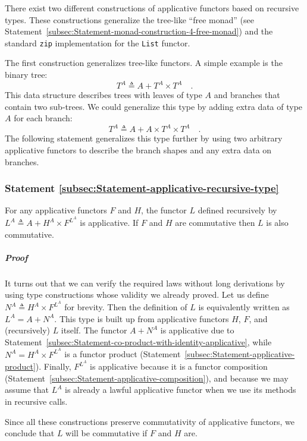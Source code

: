 There exist two different constructions of applicative functors based
on recursive types. These constructions generalize the tree-like \textsf{``}free
monad\textsf{''} (see Statement~\ref{subsec:Statement-monad-construction-4-free-monad})
and the standard \lstinline!zip! implementation for the \lstinline!List!
functor.

The first construction generalizes tree-like functors. A simple example
is the binary tree:
\[
T^{A}\triangleq A+T^{A}\times T^{A}\quad.
\]
This data structure describes trees with leaves of type $A$ and branches
that contain two sub-trees. We could generalize this type by adding
extra data of type $A$ for each branch:
\[
T^{A}\triangleq A+A\times T^{A}\times T^{A}\quad.
\]
The following statement generalizes this type further by using two
arbitrary applicative functors to describe the branch shapes and any
extra data on branches.

\subsubsection{Statement \label{subsec:Statement-applicative-recursive-type}\ref{subsec:Statement-applicative-recursive-type}}

For any applicative functors $F$ and $H$, the functor $L$ defined
recursively by $L^{A}\triangleq A+H^{A}\times F^{L^{A}}$ is applicative.
If $F$ and $H$ are commutative then $L$ is also commutative.

\subparagraph{Proof}

It turns out that we can verify the required laws without long derivations
by using type constructions whose validity we already proved. Let
us define $N^{A}\triangleq H^{A}\times F^{L^{A}}$ for brevity. Then
the definition of $L$ is equivalently written as $L^{A}=A+N^{A}$.
This type is built up from applicative functors $H$, $F$, and (recursively)
$L$ itself. The functor $A+N^{A}$ is applicative due to Statement~\ref{subsec:Statement-co-product-with-identity-applicative},
while $N^{A}=H^{A}\times F^{L^{A}}$ is a functor product (Statement~\ref{subsec:Statement-applicative-product}).
Finally, $F^{L^{A}}$ is applicative because it is a functor composition
(Statement~\ref{subsec:Statement-applicative-composition}), and
because we may assume that $L^{A}$ is already a lawful applicative
functor when we use its methods in recursive calls.

Since all these constructions preserve commutativity of applicative
functors, we conclude that $L$ will be commutative if $F$ and $H$
are.

